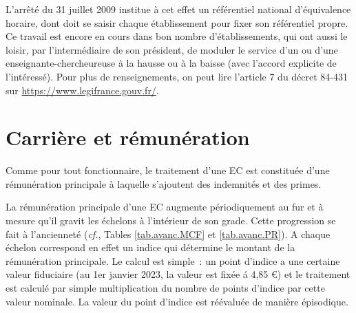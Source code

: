 \label{referentiel}
L'arr\^et\'e du 31 juillet 2009 institue \`a cet effet un r\'ef\'erentiel
national d'\'equivalence horaire, dont doit se saisir chaque \'etablissement
pour fixer son r\'ef\'erentiel propre. Ce travail est encore en cours dans bon nombre
d'\'etablissements, qui ont aussi le loisir, par l'interm\'ediaire de son pr\'esident,
de moduler le service d'un ou d'une enseignant\mp e-chercheur\mp euse \`a la hausse ou \`a la baisse (avec l'accord
explicite de l'int\'eress\'e). Pour plus de renseignements, on peut lire l'article 7 du d\'ecret 84-431 sur
\url{https://www.legifrance.gouv.fr/}.


\section{Carri\`ere et r\'emun\'eration}
\label{salairesEC}

Comme pour tout fonctionnaire, le traitement d'un\mp e EC est constitu\'ee
d'une r\'emun\'eration principale \`a laquelle s'ajoutent des indemnit\'es et des primes.

La r\'emun\'eration principale d'un\mp e EC augmente
p\'e\-rio\-di\-quement au fur et \`a mesure qu'il gravit les
\'echelons \`a l'int\'erieur de son grade. Cette progression se fait \`a l'anciennet\'e ({\em cf.}, Tables \ref{tab.avanc.MCF} et \ref{tab.avanc.PR}).
A chaque \'echelon correspond en effet un indice qui d\'etermine le montant de la
r\'emun\'eration principale. Le calcul est simple~: un point
d'indice a une certaine valeur fiduciaire (au 1er janvier 2023, la valeur est fix\'ee \'a 4,85 \euro) et le traitement est
calcul\'e par simple multiplication du nombre de points d'indice par
cette valeur nominale. La valeur du point d'indice est
r\'e\'evalu\'ee de mani\`ere \'episodique.

